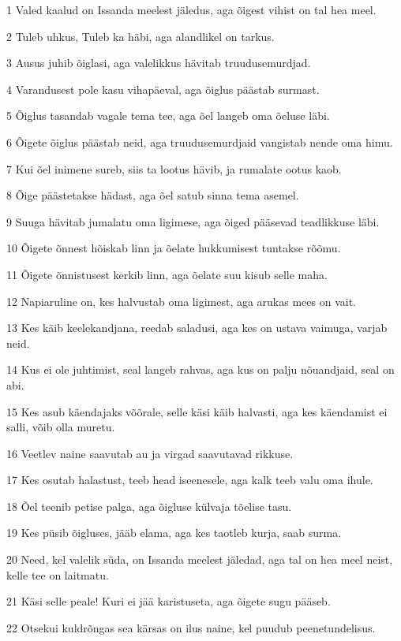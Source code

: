 \par 1 Valed kaalud on Issanda meelest jäledus, aga õigest vihist on tal hea meel.
\par 2 Tuleb uhkus, Tuleb ka häbi, aga alandlikel on tarkus.
\par 3 Ausus juhib õiglasi, aga valelikkus hävitab truudusemurdjad.
\par 4 Varandusest pole kasu vihapäeval, aga õiglus päästab surmast.
\par 5 Õiglus tasandab vagale tema tee, aga õel langeb oma õeluse läbi.
\par 6 Õigete õiglus päästab neid, aga truudusemurdjaid vangistab nende oma himu.
\par 7 Kui õel inimene sureb, siis ta lootus hävib, ja rumalate ootus kaob.
\par 8 Õige päästetakse hädast, aga õel satub sinna tema asemel.
\par 9 Suuga hävitab jumalatu oma ligimese, aga õiged pääsevad teadlikkuse läbi.
\par 10 Õigete õnnest hõiskab linn ja õelate hukkumisest tuntakse rõõmu.
\par 11 Õigete õnnistusest kerkib linn, aga õelate suu kisub selle maha.
\par 12 Napiaruline on, kes halvustab oma ligimest, aga arukas mees on vait.
\par 13 Kes käib keelekandjana, reedab saladusi, aga kes on ustava vaimuga, varjab neid.
\par 14 Kus ei ole juhtimist, seal langeb rahvas, aga kus on palju nõuandjaid, seal on abi.
\par 15 Kes asub käendajaks võõrale, selle käsi käib halvasti, aga kes käendamist ei salli, võib olla muretu.
\par 16 Veetlev naine saavutab au ja virgad saavutavad rikkuse.
\par 17 Kes osutab halastust, teeb head iseenesele, aga kalk teeb valu oma ihule.
\par 18 Õel teenib petise palga, aga õigluse külvaja tõelise tasu.
\par 19 Kes püsib õigluses, jääb elama, aga kes taotleb kurja, saab surma.
\par 20 Need, kel valelik süda, on Issanda meelest jäledad, aga tal on hea meel neist, kelle tee on laitmatu.
\par 21 Käsi selle peale! Kuri ei jää karistuseta, aga õigete sugu pääseb.
\par 22 Otsekui kuldrõngas sea kärsas on ilus naine, kel puudub peenetundelisus.
